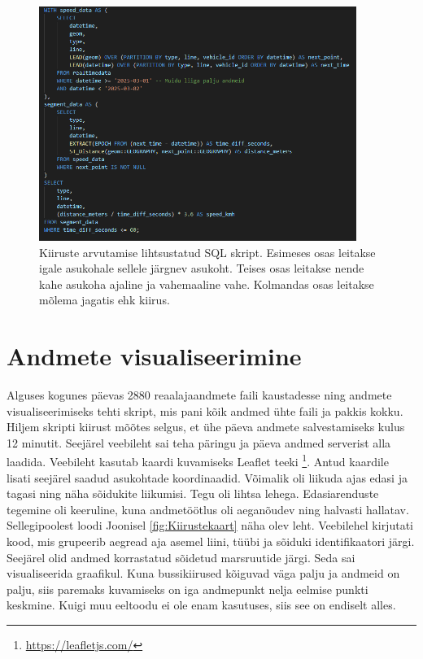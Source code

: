 \begin{figure}[h!]
    \centering
    \includegraphics[width=0.92\textwidth]{figures/Sqlscript.png}
    \caption{Kiiruste arvutamise lihtsustatud SQL skript. Esimeses osas leitakse igale asukohale sellele järgnev asukoht. Teises osas leitakse nende kahe asukoha ajaline ja vahemaaline vahe. Kolmandas osas leitakse mõlema jagatis ehk kiirus.}
    \label{fig:kiirusteSQLskript}
\end{figure}

\section{Andmete visualiseerimine}

Alguses kogunes päevas 2880 reaalajaandmete faili kaustadesse ning andmete visualiseerimiseks tehti skript, mis pani kõik andmed ühte faili ja pakkis kokku. Hiljem skripti kiirust mõõtes selgus, et ühe päeva andmete salvestamiseks kulus 12 minutit. Seejärel veebileht sai teha päringu ja päeva andmed serverist alla laadida. Veebileht kasutab kaardi kuvamiseks Leaflet teeki \footnote{\url{https://leafletjs.com/}}. Antud kaardile lisati seejärel saadud asukohtade koordinaadid. Võimalik oli liikuda ajas edasi ja tagasi ning näha sõidukite liikumisi. Tegu oli lihtsa lehega. Edasiarenduste tegemine oli keeruline, kuna andmetöötlus oli aeganõudev ning halvasti hallatav. Sellegipoolest loodi Joonisel \ref{fig:Kiirustekaart} näha olev leht. Veebilehel kirjutati kood, mis grupeerib aegread aja asemel liini, tüübi ja sõiduki identifikaatori järgi. Seejärel olid andmed korrastatud sõidetud marsruutide järgi. Seda sai visualiseerida graafikul. Kuna bussikiirused kõiguvad väga palju ja andmeid on palju, siis paremaks kuvamiseks on iga andmepunkt nelja eelmise punkti keskmine. Kuigi muu eeltoodu ei ole enam kasutuses, siis see on endiselt alles.

